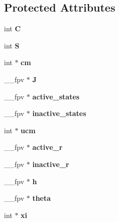 \subsection*{Protected Attributes}
\begin{DoxyCompactItemize}
\item 
\hypertarget{class_l_c___p_net_ac6fbf61a77df3fefd1add38665e7b717}{}int {\bfseries C}\label{class_l_c___p_net_ac6fbf61a77df3fefd1add38665e7b717}

\item 
\hypertarget{class_l_c___p_net_ab6a71cf2a87d2a84ef26d63da7cb28c7}{}int {\bfseries S}\label{class_l_c___p_net_ab6a71cf2a87d2a84ef26d63da7cb28c7}

\item 
\hypertarget{class_l_c___p_net_a4d5e6bfeff710d069640abaabf92e9d8}{}int $\ast$ {\bfseries cm}\label{class_l_c___p_net_a4d5e6bfeff710d069640abaabf92e9d8}

\item 
\hypertarget{class_l_c___p_net_a07424445de5664c7840fa76867d01491}{}\+\_\+\+\_\+fpv $\ast$ {\bfseries J}\label{class_l_c___p_net_a07424445de5664c7840fa76867d01491}

\item 
\hypertarget{class_l_c___p_net_a4c085a26d4bc5cc9c048f5652bf7d3c7}{}\+\_\+\+\_\+fpv $\ast$ {\bfseries active\+\_\+states}\label{class_l_c___p_net_a4c085a26d4bc5cc9c048f5652bf7d3c7}

\item 
\hypertarget{class_l_c___p_net_aa286239886cffadfb0098b4af9391cfd}{}\+\_\+\+\_\+fpv $\ast$ {\bfseries inactive\+\_\+states}\label{class_l_c___p_net_aa286239886cffadfb0098b4af9391cfd}

\item 
\hypertarget{class_l_c___p_net_af1e4cb3b01d9eea8dc4ee932ac486f5f}{}int $\ast$ {\bfseries ucm}\label{class_l_c___p_net_af1e4cb3b01d9eea8dc4ee932ac486f5f}

\item 
\hypertarget{class_l_c___p_net_a232191ada434e427069b9d73a32c6c11}{}\+\_\+\+\_\+fpv $\ast$ {\bfseries active\+\_\+r}\label{class_l_c___p_net_a232191ada434e427069b9d73a32c6c11}

\item 
\hypertarget{class_l_c___p_net_a4eefb8f8377ce107099d63bbc3b129bf}{}\+\_\+\+\_\+fpv $\ast$ {\bfseries inactive\+\_\+r}\label{class_l_c___p_net_a4eefb8f8377ce107099d63bbc3b129bf}

\item 
\hypertarget{class_l_c___p_net_a0f89876853795e0366d6f771295ec785}{}\+\_\+\+\_\+fpv $\ast$ {\bfseries h}\label{class_l_c___p_net_a0f89876853795e0366d6f771295ec785}

\item 
\hypertarget{class_l_c___p_net_ab4352d5dd32171b45a3471be0de07a77}{}\+\_\+\+\_\+fpv $\ast$ {\bfseries theta}\label{class_l_c___p_net_ab4352d5dd32171b45a3471be0de07a77}

\item 
\hypertarget{class_l_c___p_net_ade19ecf3ac391db683a740bde9fde66b}{}int $\ast$ {\bfseries xi}\label{class_l_c___p_net_ade19ecf3ac391db683a740bde9fde66b}

\end{DoxyCompactItemize}
